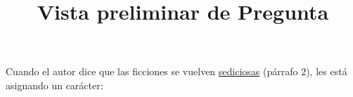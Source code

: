 \documentclass[a4paper,10pt]{article}\usepackage[utf8]{inputenc}\usepackage[spanish]{babel}\usepackage{times}
\title{Vista preliminar de Pregunta}
\begin{document}
\twocolumn 

\maketitle

Cuando el autor dice que las ficciones se vuelven \underline{ sediciosas} (párrafo 2), les está asignando un carácter:
\end{document}
